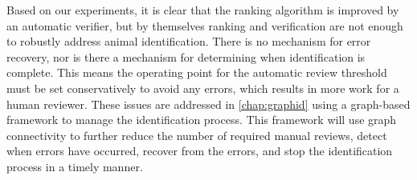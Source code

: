     Based on our experiments, it is clear that the ranking algorithm is improved by an automatic verifier, but by
      themselves ranking and verification are not enough to robustly address animal identification.
    There is no mechanism for error recovery, nor is there a mechanism for determining when identification is
      complete.
    This means the operating point for the automatic review threshold must be set conservatively to avoid any
      errors, which results in more work for a human reviewer.
    These issues are addressed in \cref{chap:graphid} using a graph-based framework to manage the identification
      process.
    This framework will use graph connectivity to further reduce the number of required manual reviews, detect
      when errors have occurred, recover from the errors, and stop the identification
      process in a timely manner.

